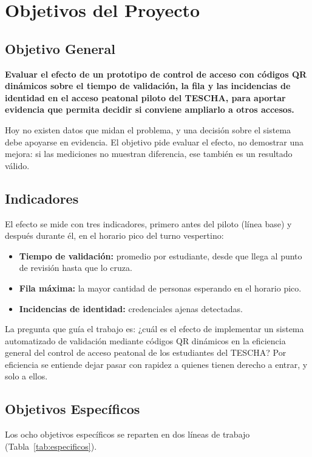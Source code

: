 \section{Objetivos del Proyecto}
\subsection{Objetivo General}
\textbf{Evaluar el efecto de un prototipo de control de acceso con códigos QR
	dinámicos sobre el tiempo de validación, la fila y las incidencias de
	identidad en el acceso peatonal piloto del TESCHA, para aportar evidencia que
	permita decidir si conviene ampliarlo a otros accesos.}

Hoy no existen datos que midan el problema, y una decisión sobre el sistema
debe apoyarse en evidencia. El objetivo pide evaluar el efecto, no demostrar
una mejora: si las mediciones no muestran diferencia, ese también es un
resultado válido.

\subsection{Indicadores}
El efecto se mide con tres indicadores, primero antes del piloto (línea base)
y después durante él, en el horario pico del turno vespertino:
\begin{itemize}
	\item \textbf{Tiempo de validación:} promedio por estudiante, desde que
	      llega al punto de revisión hasta que lo cruza.
	\item \textbf{Fila máxima:} la mayor cantidad de personas esperando en el
	      horario pico.
	\item \textbf{Incidencias de identidad:} credenciales ajenas detectadas.
\end{itemize}
La pregunta que guía el trabajo es: ¿cuál es el efecto de implementar un
sistema automatizado de validación mediante códigos QR dinámicos en la
eficiencia general del control de acceso peatonal de los estudiantes del
TESCHA? Por eficiencia se entiende dejar pasar con rapidez a quienes tienen
derecho a entrar, y solo a ellos.

\subsection{Objetivos Específicos}
Los ocho objetivos específicos se reparten en dos líneas de trabajo
(Tabla~\ref{tab:especificos}).

